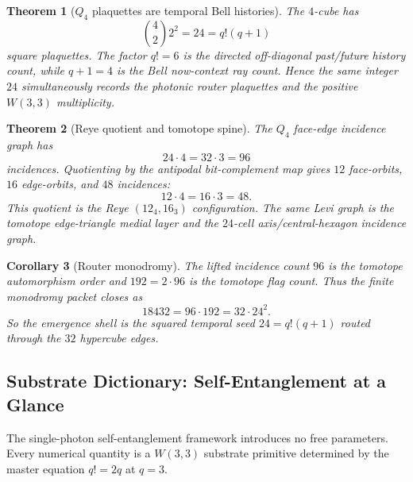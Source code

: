 ﻿\documentclass[12pt]{article}
\newtheorem{theorem}{Theorem}[section]
\newtheorem{corollary}[theorem]{Corollary}
\begin{document}
\begin{theorem}[$Q_4$ plaquettes are temporal Bell histories]\label{thm:q4_plaquettes}
The $4$-cube has
\[
  \binom{4}{2}2^{2}=24=q!(q+1)
\]
square plaquettes.  The factor $q!=6$ is the directed off-diagonal
past/future history count, while $q+1=4$ is the Bell now-context ray
count.  Hence the same integer $24$ simultaneously records the photonic
router plaquettes and the positive $W(3,3)$ multiplicity.
\end{theorem}

\begin{theorem}[Reye quotient and tomotope spine]\label{thm:q4_tomotope_reye}
The $Q_4$ face-edge incidence graph has
\[
  24\cdot4=32\cdot3=96
\]
incidences.  Quotienting by the antipodal bit-complement map gives
$12$ face-orbits, $16$ edge-orbits, and $48$ incidences:
\[
  12\cdot4=16\cdot3=48.
\]
This quotient is the Reye $(12_4,16_3)$ configuration.  The same Levi
graph is the tomotope edge-triangle medial layer and the $24$-cell
axis/central-hexagon incidence graph.
\end{theorem}

\begin{corollary}[Router monodromy]\label{cor:q4_router_monodromy}
The lifted incidence count $96$ is the tomotope automorphism order and
$192=2\cdot96$ is the tomotope flag count.  Thus the finite monodromy
packet closes as
\[
  18432 = 96\cdot192 = 32\cdot24^2.
\]
So the emergence shell is the squared temporal seed $24=q!(q+1)$ routed
through the $32$ hypercube edges.
\end{corollary}

\subsection{Substrate Dictionary: Self-Entanglement at a Glance}
\label{sec:dictionary}

The single-photon self-entanglement framework introduces no free parameters.
Every numerical quantity is a $W(3,3)$ substrate primitive determined by the
master equation $q! = 2q$ at $q = 3$.
\end{document}

